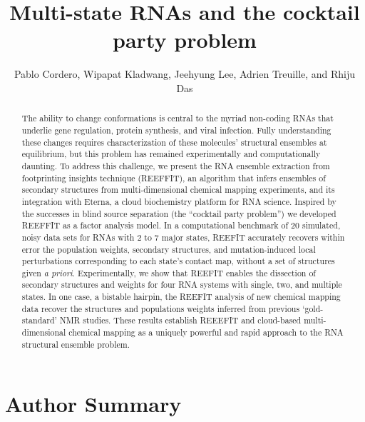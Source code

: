 \documentclass[12pt]{article}
\title{Multi-state RNAs and the cocktail party problem}
\author{Pablo Cordero, Wipapat Kladwang, Jeehyung Lee, Adrien Treuille, and Rhiju Das}
\begin{document}
\maketitle

\begin{abstract}
The ability to change conformations is central to the myriad non-coding RNAs that underlie gene regulation, protein synthesis, and viral infection. 
Fully understanding these changes requires characterization of these molecules' structural ensembles at equilibrium, but this problem has remained experimentally and computationally daunting. 
To address this challenge, we present the RNA ensemble extraction from footprinting insights technique (REEFFIT), an algorithm that infers ensembles of secondary structures from multi-dimensional chemical mapping experiments, and its integration with Eterna, a cloud biochemistry platform for RNA science. 
Inspired by the successes in blind source separation (the ``cocktail party problem'') we developed REEFFIT as a factor analysis model. 
In a computational benchmark of 20 simulated, noisy data sets for RNAs with 2 to 7 major states, REEFIT accurately recovers within error the population weights, secondary structures, and mutation-induced local perturbations corresponding to each state's contact map, without a set of structures given \textit{a priori}. 
Experimentally, we show that REEFIT enables the dissection of secondary structures and weights for four RNA systems with single, two, and multiple states. 
In one case, a bistable hairpin, the REEFIT analysis of new chemical mapping data recover the structures and populations weights inferred from previous `gold-standard' NMR studies. 
These results establish REEEFIT and cloud-based multi-dimensional chemical mapping as a uniquely powerful and rapid approach to the RNA structural ensemble problem.
\end{abstract}

\section{Author Summary}
\end{document}
